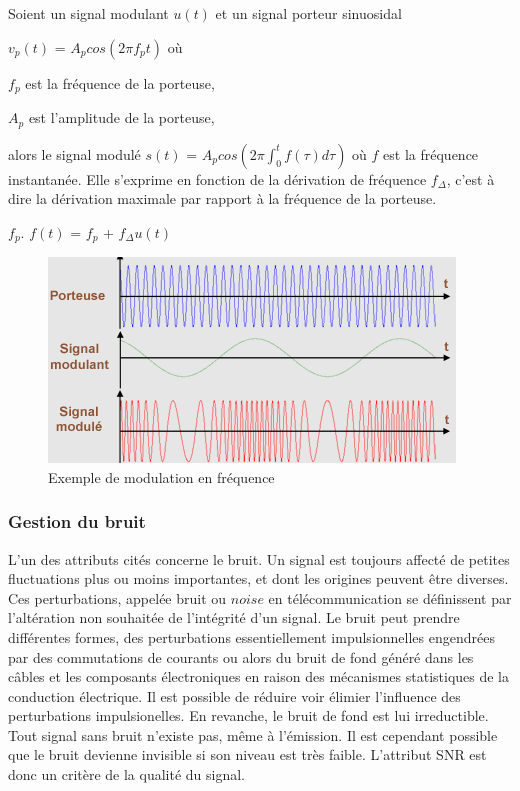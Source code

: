 \vspace{0.1cm}

Soient un signal modulant $u(t)$ et un signal porteur sinuosidal

\vspace{0.1cm}

$v_{p}(t)$ = $A_{p}cos(2\pi f_{p}t)$ où

$f_{p}$ est la fréquence de la porteuse,

$A_{p}$ est l'amplitude de la porteuse,

alors le signal modulé $s(t)$ = $A_{p}cos(2\pi \int_{0}^{t}f(\tau)d\tau)$ où $f$ est la fréquence instantanée. Elle s'exprime en fonction de la dérivation de fréquence $f_{\Delta}$, c'est à dire la dérivation maximale par rapport à la fréquence de la porteuse.

\newpage

$f_{p}$. $f(t)$ = $f_{p}$ + $f_{\Delta} u(t)$

\begin{figure}[h]
\centering

\includegraphics[scale=1]{images/FM_mod.PNG}
\caption{Exemple de modulation en fréquence}\label{term4}
\end{figure}



\subsubsection{Gestion du bruit}



L'un des attributs cités concerne le bruit. Un signal est toujours affecté de petites fluctuations plus ou moins importantes, et dont les origines peuvent être diverses. Ces perturbations, appelée bruit ou $noise$ en télécommunication se définissent par l'altération non souhaitée de l'intégrité d'un signal. Le bruit peut prendre différentes formes, des perturbations essentiellement impulsionnelles engendrées par des commutations de courants ou alors du bruit de fond généré dans les câbles et les composants électroniques en raison
des mécanismes statistiques de la conduction électrique. Il est possible de réduire voir élimier l'influence des perturbations impulsionelles. En revanche, le bruit de fond est lui irreductible. Tout signal sans bruit n'existe pas, même à l'émission. Il est cependant possible que le bruit devienne invisible si son niveau est très faible. L'attribut SNR est donc un critère de la qualité du signal.

